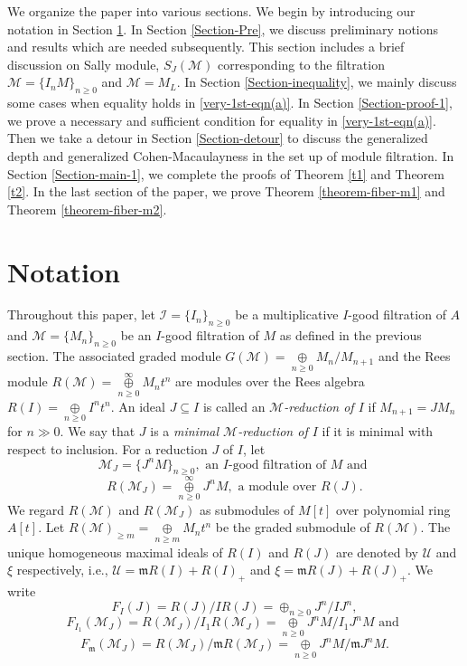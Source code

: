 \documentclass[11pt,reqno]{amsart}
\theoremstyle{definition}
\newcommand{\m}{\mathfrak m}
\def\U{{\mathcal U}}
\def\M{{\mathcal M}}
\def\I{{\mathcal I}}
\numberwithin{equation}{section}
\begin{document}
 	We organize the paper into various sections. We begin by introducing our notation in Section \ref{notation}. In Section \ref{Section-Pre}, we discuss preliminary notions and results which are needed subsequently. This section includes a brief discussion on Sally module, $S_J(\M)$ corresponding to the filtration $\M=\{I_nM\}_{n\geq 0}$ and $\M=M_L.$ In Section \ref{Section-inequality}, we mainly discuss some cases when equality holds in \eqref{very-1st-eqn(a)}. In Section \ref{Section-proof-1}, we prove a necessary and sufficient condition for equality in \eqref{very-1st-eqn(a)}. Then we take a detour in Section \ref{Section-detour} to discuss the generalized depth and generalized Cohen-Macaulayness in the set up of module filtration. In Section \ref{Section-main-1}, we complete the proofs of Theorem \ref{t1} and Theorem \ref{t2}. In the last section of the paper, we prove Theorem \ref{theorem-fiber-m1} and Theorem \ref{theorem-fiber-m2}. 
    
\section{Notation}\label{notation}

    
    Throughout this paper, let $\I=\{I_n\}_{n\geq 0}$ be a multiplicative $I$-good filtration of $A$ and $\M=\{M_n\}_{n\geq 0}$ be an $I$-good filtration of $M$ as defined in the previous section. The associated graded module $G(\M)=\mathop{\oplus}\limits_{n\geq 0} M_n/M_{n+1}$ and the Rees module $R(\M)=\mathop{\oplus}\limits_{n\geq 0}^\infty M_nt^n$ are modules over the Rees algebra $R(I)=\mathop{\oplus}\limits_{n\geq 0} I^nt^n$. An ideal $J\subseteq I$ is called an {\em $\M$-reduction of $I$} if $M_{n+1}=JM_{n}$ for $n\gg 0.$ We say that $J$ is a {\em minimal $\M$-reduction of $I$} if it is minimal with respect to inclusion. For a reduction $J$ of $I$, let $$\M_J=\{J^nM\}_{n\geq 0},\text{ an $I$-good filtration of $M$ and }$$  $$R(\M_J)= \mathop{\oplus}\limits_{n\geq 0}^\infty J^nM, \text{ a module over } R(J).$$ 
We regard $R(\M)$ and $R(\M_J)$ as submodules of $M[t]$ over polynomial ring $A[t].$ Let $R(\M)_{\geq m}=\mathop{\oplus}\limits_{n\geq m}M_nt^n$ be the graded submodule of $R(\M).$ The unique homogeneous maximal ideals of $R(I)$ and $R(J)$ are denoted by $\U$ and $\xi$ respectively, i.e., $\U=\m R(I)+R(I)_+$ and $\xi = \m R(J)+R(J)_+.$ We write $$F_I(J)=R(J)/IR(J)=\mathop{\oplus}_{n\geq 0} J^n/IJ^n,$$ $$F_{I_1}(\M_J)=R(\M_J)/I_1R(\M_J)=\mathop{\oplus}\limits_{n\geq 0}J^nM/I_1J^nM \text{ and }$$ $$F_\m(\M_J)=R(\M_J)/\m R(\M_J)=\mathop{\oplus}\limits_{n\geq 0}J^nM/\m J^nM.$$
\end{document}
